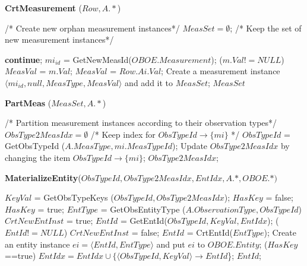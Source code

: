 \documentclass[10pt]{article}
\begin{document}
\begin{algorithm} [htb]
\caption{{\bf CrtMeasurement} ($Row, A.*$)}
{\small
\begin{algorithmic}
    \STATE/* Create new orphan measurement instances*/
    \STATE $MeasSet = \emptyset$; /* Keep the set of new measurement instances*/
		
		  {\bf continue};
		\STATE $mi_{id}$ = GetNewMeasId($OBOE.Measurement$);
		 ($m.Val!=NULL$) $MeasVal$ = $m.Val$;
		 $MeasVal$ = $Row.Ai.Val$;
		\STATE Create a measurement instance $\langle mi_{id}, null, MeasType, MeasVal\rangle$ and add it to $MeasSet$;
	\ENDFOR
    \RETURN $MeasSet$
\end{algorithmic}
}
\end{algorithm}

\begin{algorithm} [htb]
\caption{{\bf PartMeas} ($MeasSet, A.*$)}
{\small
\begin{algorithmic}
    \STATE /* Partition measurement instances according to their observation types*/
    \STATE $ObsType2MeasIdx=\emptyset$ /* Keep index for $ObsTypeId \rightarrow \{mi\}$ */
    \STATE $ObsTypeId$ = GetObsTypeId ($A.MeasType, mi.MeasTypeId$);
	\STATE Update $ObsType2MeasIdx$ by changing the item $ObsTypeId \rightarrow \{mi\}$;
    \ENDFOR
    \RETURN $ObsType2MeasIdx$;
\end{algorithmic}
}
\end{algorithm}

\begin{algorithm} [htb]
\caption{{\bf MaterializeEntity}($ObsTypeId, ObsType2MeasIdx, EntIdx, A.*, OBOE.*)$}
{\small
\begin{algorithmic}
\STATE $KeyVal$ = GetObsTypeKeys ($ObsTypeId, ObsType2MeasIdx$);
\STATE $HasKey$ = false;
     $HasKey$ = true;
\STATE $EntType$ = GetObsEntityType ($A.ObservationType, ObsTypeId$)
\STATE $CrtNewEntInst$ = true;
	\STATE $EntId$ = GetEntId($ObsTypeId, KeyVal, EntIdx$); %
	 {($EntId!=NULL$)} $CrtNewEntInst$ = false;
\ENDIF
{}
	\STATE $EntId$ = CrtEntId($EntType$);
	\STATE Create an entity instance $ei = \langle EntId, EntType\rangle $ and put $ei$ to $OBOE.Entity$;
	 ($HasKey$==true) $EntIdx = EntIdx \cup \{\langle ObsTypeId, KeyVal \rangle \rightarrow EntId$\};
\ENDIF
\RETURN $EntId$;
\end{algorithmic}
}
\end{algorithm}
\end{document}
